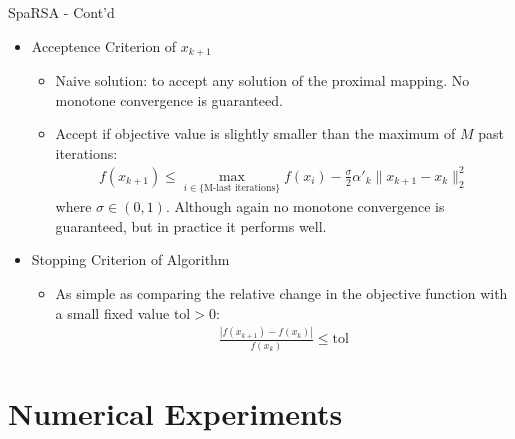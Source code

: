 \documentclass{beamer}
\begin{document}
\begin{frame}{SpaRSA - Cont'd}

    \begin{itemize}
        \item Acceptence Criterion of $x_{k+1}$
        \pause
        \begin{itemize}
            \item Naive solution: to accept any solution of the proximal mapping. No monotone convergence is guaranteed.
            \pause
            \item Accept if objective value is slightly smaller than the maximum of $M$ past iterations:
            \begin{align*}
                f(x_{k+1})\leq \max_{i\in \{\text{M-last iterations}\}} f(x_i)-\frac{\sigma}{2}\alpha'_k\|x_{k+1}-x_k\|_2^2
            \end{align*}
            where $\sigma\in(0,1)$.  Although again no monotone convergence is guaranteed, but in practice it performs well.
        \end{itemize}

        \pause
        \item Stopping Criterion of Algorithm
        \pause
        \begin{itemize}
            \item As simple as comparing the relative change in the objective function with a small fixed value $\mathrm{tol} > 0$:
            \begin{align*}
                \frac{|f(x_{k+1})-f(x_k)|}{f(x_k)}\leq \mathrm{tol}
            \end{align*}
        \end{itemize}
        
    \end{itemize}
\end{frame}

\section{Numerical Experiments}
\end{document}

